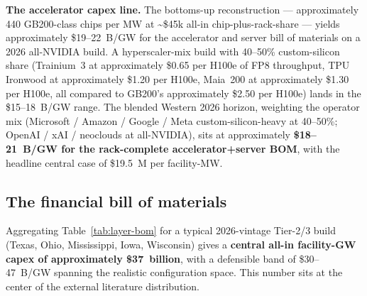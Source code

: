 \documentclass[11pt,a4paper]{article}
\begin{document}
\textbf{The accelerator capex line.} The bottoms-up reconstruction --- approximately 440 GB200-class chips per MW at \textasciitilde\$45k all-in chip-plus-rack-share --- yields approximately \$19--22~B/GW for the accelerator and server bill of materials on a 2026 all-NVIDIA build. A hyperscaler-mix build with 40--50\% custom-silicon share (Trainium~3 at approximately \$0.65 per H100e of FP8 throughput, TPU Ironwood at approximately \$1.20 per H100e, Maia~200 at approximately \$1.30 per H100e, all compared to GB200's approximately \$2.50 per H100e) lands in the \$15--18~B/GW range. The blended Western 2026 horizon, weighting the operator mix (Microsoft / Amazon / Google / Meta custom-silicon-heavy at 40--50\%; OpenAI / xAI / neoclouds at all-NVIDIA), sits at approximately \textbf{\$18--21~B/GW for the rack-complete accelerator+server BOM}, with the headline central case of \$19.5~M per facility-MW.

\subsection{The financial bill of materials}
\label{subsec:financial-bom}

Aggregating Table~\ref{tab:layer-bom} for a typical 2026-vintage Tier-2/3 build (Texas, Ohio, Mississippi, Iowa, Wisconsin) gives a \textbf{central all-in facility-GW capex of approximately \$37~billion}, with a defensible band of \$30--47~B/GW spanning the realistic configuration space. This number sits at the center of the external literature distribution.
\end{document}
